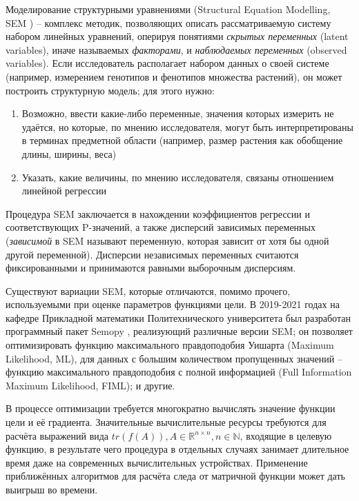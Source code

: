 Моделирование структурными уравнениями (Structural Equation Modelling, SEM \cite{hoyle2021sem}) -- комплекс методик, позволяющих описать рассматриваемую систему набором линейных уравнений, оперируя понятиями \emph{скрытых переменных} (latent variables), иначе называемых \emph{факторами}, и \emph{наблюдаемых переменных} (observed variables).
Если исследователь располагает набором данных о своей системе (например, измерением генотипов и фенотипов множества растений), он может построить структурную модель; для этого нужно:
\begin{enumerate}
    \item Возможно, ввести какие-либо переменные, значения которых измерить не удаётся, но которые, по мнению исследователя, могут быть интерпретированы в терминах предметной области (например, размер растения как обобщение длины, ширины, веса)
    \item Указать, какие величины, по мнению исследователя, связаны отношением линейной регрессии
\end{enumerate}

Процедура SEM заключается в нахождении коэффициентов регрессии и соответствующих P-значений, а также дисперсий зависимых переменных (\emph{зависимой} в SEM называют переменную, которая зависит от хотя бы одной другой переменной).
Дисперсии независимых переменных считаются фиксированными и принимаются равными выборочным дисперсиям.

Существуют вариации SEM, которые отличаются, помимо прочего, используемыми при оценке параметров функциями цели.
В 2019-2021 годах на кафедре Прикладной математики Политехнического университета был разработан программный пакет Semopy \cite{semopy, semopy2}, реализующий различные версии SEM; он позволяет оптимизировать функцию максимального правдоподобия Уишарта (Maximum Likelihood, ML), для данных с большим количеством пропущенных значений -- функцию максимального правдоподобия с полной информацией (Full Information Maximum Likelihood, FIML); и другие.

В процессе оптимизации требуется многократно вычислять значение функции цели и её градиента.
Значительные вычислительные ресурсы требуются для расчёта выражений вида $ tr(f(A)), A \in \mathds{R}^{n \times n}, n \in \mathds N $, входящие в целевую функцию, в результате чего процедура в отдельных случаях занимает длительное время даже на современных вычислительных устройствах.
Применение приближённых алгоритмов для расчёта следа от матричной функции может дать выигрыш во времени.
